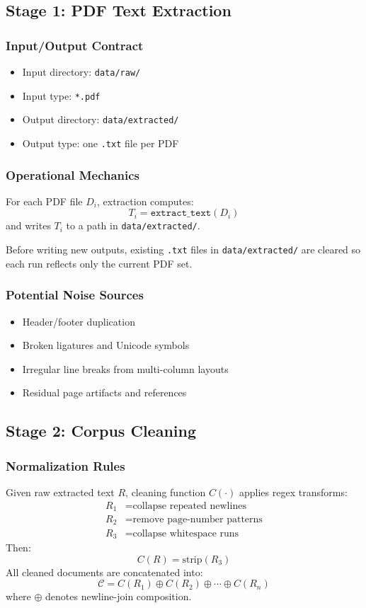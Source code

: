 \documentclass[a4paper,11pt]{article}
\begin{document}
\subsection{Stage 1: PDF Text Extraction}
\subsubsection{Input/Output Contract}
\begin{itemize}[leftmargin=1.5em]
    \item Input directory: \texttt{data/raw/}
    \item Input type: \texttt{*.pdf}
    \item Output directory: \texttt{data/extracted/}
    \item Output type: one \texttt{.txt} file per PDF
\end{itemize}

\subsubsection{Operational Mechanics}
For each PDF file $D_i$, extraction computes:
\[
T_i = \texttt{extract\_text}(D_i)
\]
and writes $T_i$ to a path in \texttt{data/extracted/}.

Before writing new outputs, existing \texttt{.txt} files in \texttt{data/extracted/} are cleared so each run reflects only the current PDF set.

\subsubsection{Potential Noise Sources}
\begin{itemize}[leftmargin=1.5em]
    \item Header/footer duplication
    \item Broken ligatures and Unicode symbols
    \item Irregular line breaks from multi-column layouts
    \item Residual page artifacts and references
\end{itemize}

\subsection{Stage 2: Corpus Cleaning}
\subsubsection{Normalization Rules}
Given raw extracted text $R$, cleaning function $C(\cdot)$ applies regex transforms:
\begin{align*}
R_1 &= \text{collapse repeated newlines} \\
R_2 &= \text{remove page-number patterns} \\
R_3 &= \text{collapse whitespace runs}
\end{align*}
Then:
\[
C(R) = \text{strip}(R_3)
\]
All cleaned documents are concatenated into:
\[
\mathcal{C} = C(R_1) \oplus C(R_2) \oplus \cdots \oplus C(R_n)
\]
where $\oplus$ denotes newline-join composition.
\end{document}
